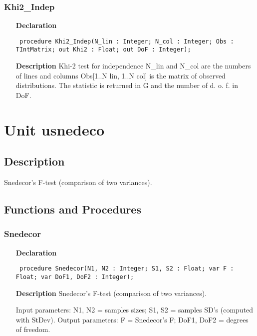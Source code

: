 \documentclass[12pt,a4paper,oneside]{report}
\newcommand{\declarationitem}[1]{\textbf{#1}}
\newcommand{\descriptiontitle}[1]{\textbf{#1}}
\newcommand{\code}[1]{\texttt{#1}}
\begin{document}
\subsubsection{Khi2{\_}Indep}
\label{ukhi2-Khi2_Indep}
\begin{itemize}\item[\declarationitem{Declaration}\hfill]
	\begin{flushleft}
		\code{
			procedure Khi2{\_}Indep(N{\_}lin : Integer; N{\_}col : Integer; Obs : TIntMatrix; out Khi2 : Float; out DoF : Integer);}
	\end{flushleft}
	\item[\descriptiontitle{Description}]
	Khi{-}2 test for independence N{\_}lin and N{\_}col are the numbers of lines and columns Obs[1..N lin, 1..N col] is the matrix of observed distributions. The statistic is returned in G and the number of d. o. f. in DoF.
\end{itemize}




\section{Unit usnedeco}
\label{usnedeco}
\subsection{Description}
Snedecor's F{-}test (comparison of two variances). 
\subsection{Functions and Procedures}
\subsubsection{Snedecor}
\label{usnedeco-Snedecor}
\begin{itemize}\item[\declarationitem{Declaration}\hfill]
	\begin{flushleft}
		\code{
			procedure Snedecor(N1, N2 : Integer; S1, S2 : Float; var F : Float; var DoF1, DoF2 : Integer);}
	\end{flushleft}
	\par
	\item[\descriptiontitle{Description}]
	Snedecor's F{-}test (comparison of two variances).
	
	Input parameters: N1, N2 = samples sizes; S1, S2 = samples SD's (computed with StDev). Output parameters: F = Snedecor's F; DoF1, DoF2 = degrees of freedom.
\end{itemize}
\end{document}
